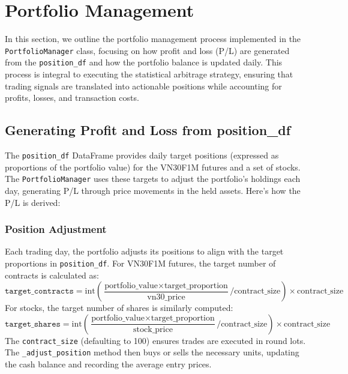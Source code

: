 \documentclass[a4paper,12pt]{article}
\begin{document}
\section{Portfolio Management}
In this section, we outline the portfolio management process implemented in the \texttt{PortfolioManager} class, focusing on how profit and loss (P/L) are generated from the \texttt{position\_df} and how the portfolio balance is updated daily. This process is integral to executing the statistical arbitrage strategy, ensuring that trading signals are translated into actionable positions while accounting for profits, losses, and transaction costs.

\subsection{Generating Profit and Loss from position\_df}
The \texttt{position\_df} DataFrame provides daily target positions (expressed as proportions of the portfolio value) for the VN30F1M futures and a set of stocks. The \texttt{PortfolioManager} uses these targets to adjust the portfolio’s holdings each day, generating P/L through price movements in the held assets. Here’s how the P/L is derived:

\subsubsection{Position Adjustment}
Each trading day, the portfolio adjusts its positions to align with the target proportions in \texttt{position\_df}. For VN30F1M futures, the target number of contracts is calculated as:
\begin{equation}
\texttt{target\_contracts} = \text{int}\left(\frac{\text{portfolio\_value} \times \text{target\_proportion}}{\text{vn30\_price}} / \text{contract\_size}\right) \times \text{contract\_size}
\end{equation}
For stocks, the target number of shares is similarly computed:
\begin{equation}
\texttt{target\_shares} = \text{int}\left(\frac{\text{portfolio\_value} \times \text{target\_proportion}}{\text{stock\_price}} / \text{contract\_size}\right) \times \text{contract\_size}
\end{equation}
The \texttt{contract\_size} (defaulting to 100) ensures trades are executed in round lots. The \texttt{\_adjust\_position} method then buys or sells the necessary units, updating the cash balance and recording the average entry prices.
\end{document}
